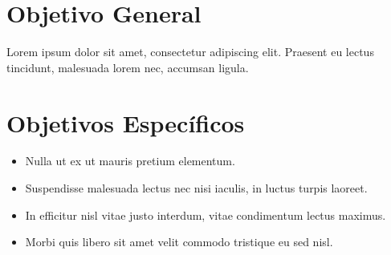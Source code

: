 \section{Objetivo General}
Lorem ipsum dolor sit amet, consectetur adipiscing elit. Praesent eu lectus tincidunt, malesuada lorem nec, accumsan ligula.

\section{Objetivos Específicos}
\begin{itemize}
\item Nulla ut ex ut mauris pretium elementum.
\item Suspendisse malesuada lectus nec nisi iaculis, in luctus turpis laoreet.
\item In efficitur nisl vitae justo interdum, vitae condimentum lectus maximus.
\item Morbi quis libero sit amet velit commodo tristique eu sed nisl.
\end{itemize}